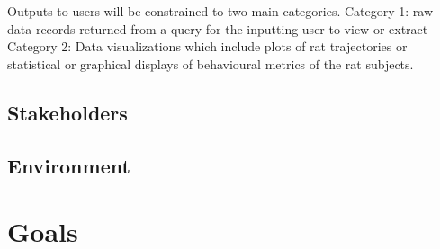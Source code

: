 \documentclass{article}
\begin{document}
\par{Outputs to users will be constrained to two main categories. Category 1: raw data records returned from a query for the inputting user to view or extract
Category 2: Data visualizations which include plots of rat trajectories or statistical or graphical displays of behavioural metrics of the rat subjects.}

\subsection{Stakeholders}

\subsection{Environment}


\section{Goals}
\end{document}
